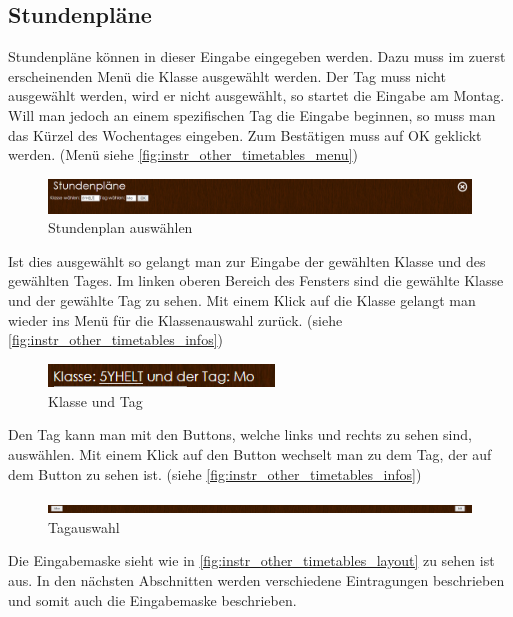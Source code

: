 \subsection{Stundenpläne}
Stundenpläne können in dieser Eingabe eingegeben werden. Dazu muss im zuerst erscheinenden Menü die Klasse ausgewählt werden. Der Tag muss nicht ausgewählt werden, wird er nicht ausgewählt, so startet die Eingabe am Montag. Will man jedoch an einem spezifischen Tag die Eingabe beginnen, so muss man das Kürzel des Wochentages eingeben. Zum Bestätigen muss auf OK geklickt werden. (Menü siehe \autoref{fig:instr_other_timetables_menu})
\begin{figure}[H]
\centering
\includegraphics[keepaspectratio=true, width=17cm]{images/screenshots/timetables_input_menu.png}
\caption{Stundenplan auswählen}
\label{fig:instr_other_timetables_menu}
\end{figure}
Ist dies ausgewählt so gelangt man zur Eingabe der gewählten Klasse und des gewählten Tages. Im linken oberen Bereich des Fensters sind die gewählte Klasse und der gewählte Tag zu sehen. Mit einem Klick auf die Klasse gelangt man wieder ins Menü für die Klassenauswahl zurück. (siehe \autoref{fig:instr_other_timetables_infos})
\begin{figure}[H]
\centering
\includegraphics[keepaspectratio=true, width=6cm]{images/screenshots/timetables_input_infos.png}
\caption{Klasse und Tag}
\label{fig:instr_other_timetables_infos}
\end{figure}
Den Tag kann man mit den Buttons, welche links und rechts zu sehen sind, auswählen.  Mit einem Klick auf den Button wechselt man zu dem Tag, der auf dem Button zu sehen ist. (siehe \autoref{fig:instr_other_timetables_infos})
\begin{figure}[H]
\centering
\includegraphics[keepaspectratio=true, width=17cm]{images/screenshots/timetables_input_day.png}
\caption{Tagauswahl}
\label{fig:instr_other_timetables_infos}
\end{figure}
Die Eingabemaske sieht wie in \autoref{fig:instr_other_timetables_layout} zu sehen ist aus. In den nächsten Abschnitten werden verschiedene Eintragungen beschrieben und somit auch die Eingabemaske beschrieben.
